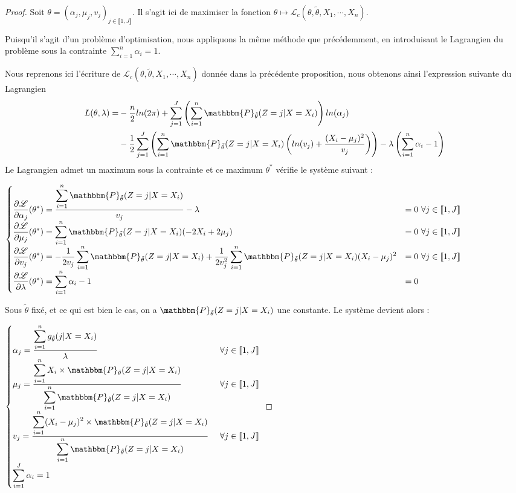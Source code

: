 \documentclass[frenchb]{report}
\newcommand{\1}{\mathbbm{1}}
\newcommand{\prob}{\mathbbm{P}}
\newcommand{\lv}{\mathcal{L}}
\newcommand{\thetat}{\tilde{\theta}}
\theoremstyle{definition}\newtheorem{defn}{Définition}
\theoremstyle{definition}\newtheorem{exm}{Exemple}
\theoremstyle{definition}\newtheorem{nota}{Notation}
\theoremstyle{definition}\newtheorem{rem}{Remarque}
\begin{document}
\begin{proof}
Soit $\theta = (\alpha_j, \mu_j, v_j)_{j\in\llbracket1,J\rrbracket}$. Il s'agit ici de maximiser la fonction $\theta \mapsto \lv_{c}(\theta,\thetat, X_1, \cdots, X_n)$.

Puisqu'il s'agit d'un problème d'optimisation, nous appliquons la même méthode que précédemment, en introduisant le Lagrangien du problème sous la contrainte $\displaystyle\sum_{i=1}^n\alpha_i = 1$.

Nous reprenons ici l'écriture de $\lv_c(\theta,\thetat,X_1, \cdots, X_n)$ donnée dans la précédente proposition, nous obtenons ainsi l'expression suivante du Lagrangien
\begin{align*}
L(\theta,\lambda) = &-\frac{n}{2}ln(2\pi)+\sum_{j=1}^J \left(\sum_{i = 1}^n  \prob_{\thetat}(Z=j|X=X_i)\right) ln(\alpha_j)\\
&-\frac{1}{2}\sum_{j=1}^J\left(\sum_{i=1}^n \prob_{\thetat}(Z=j|X=X_i)\left(ln(v_j)+\frac{(X_i-\mu_j)^2}{v_j}\right)\right) - \lambda\left(\sum_{i=1}^n\alpha_i-1\right)
\end{align*}
Le Lagrangien admet un maximum sous la contrainte et ce maximum $\theta^*$ vérifie le système suivant :

$
\begin{cases}
\displaystyle\frac{\partial \lv}{\partial \alpha_j} (\theta^*) = \frac{\displaystyle\sum_{i=1}^n \prob_{\thetat}(Z=j|X=X_i)}{v_j} - \lambda &=0 \text{ } \forall j \in \llbracket 1,J \rrbracket \\
\displaystyle\frac{\partial \lv}{\partial \mu_j} (\theta^*) = \displaystyle\sum_{i=1}^n \prob_{\thetat}(Z=j|X=X_i)(-2X_i+2\mu_j) &=0 \text{ } \forall j \in \llbracket 1,J \rrbracket \\
\displaystyle\frac{\partial \lv}{\partial v_j} (\theta^*) = -\displaystyle\frac{1}{2v_j}\sum_{i=1}^n \prob_{\thetat}(Z=j|X=X_i) + \frac{1}{2v_j^2}\sum_{i=1}^n \prob_{\thetat}(Z=j|X=X_i)(X_i-\mu_j)^2 &=0 \text{ } \forall j \in \llbracket 1,J \rrbracket \\
\displaystyle\frac{\partial \lv}{\partial \lambda} (\theta^*) = \sum_{i=1}^n\alpha_i-1 &=0 
\end{cases}
$

Sous $\thetat$ fixé, et ce qui est bien le cas, on a $\prob_{\thetat}(Z=j|X=X_i)$ une constante. 
Le système devient alors :

$
\begin{cases}
\alpha_j =\displaystyle \frac{\displaystyle\sum_{i=1}^n g_{\thetat}(j|X=X_i)}{\lambda} &\text{ } \forall j \in \llbracket 1,J \rrbracket \\
\mu_j =\displaystyle \frac{\displaystyle\sum_{i=1}^n X_i\times\prob_{\thetat}(Z=j|X=X_i)}{\displaystyle\sum_{i=1}^n \prob_{\thetat}(Z=j|X=X_i)} &\text{ } \forall j \in \llbracket 1,J \rrbracket \\
v_j = \displaystyle\frac{\displaystyle\sum_{i=1}^n (X_i -\mu_j)^2 \times\prob_{\thetat}(Z=j|X=X_i)}{\displaystyle\displaystyle\sum_{i=1}^n\prob_{\thetat}(Z=j|X=X_i)} &\text{ } \forall j \in \llbracket 1,J \rrbracket \\
\displaystyle\sum_{i=1}^J\alpha_i =1 
\end{cases}
$


\end{proof}
\end{document}
